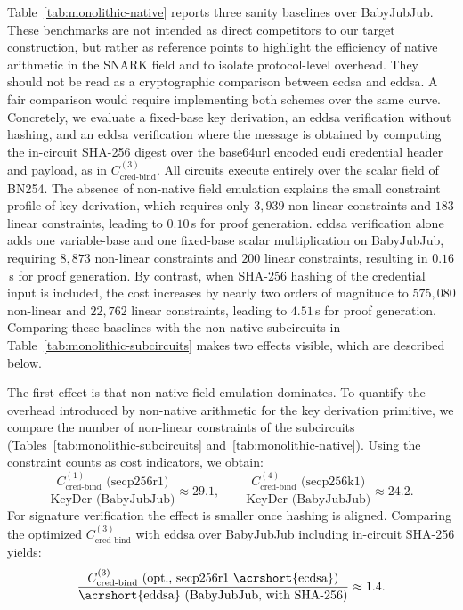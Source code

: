 Table~\ref{tab:monolithic-native} reports three sanity baselines over BabyJubJub. These benchmarks are not intended as direct competitors to our target construction, but rather as reference points to highlight the efficiency of native arithmetic in the SNARK field and to isolate protocol-level overhead. They should not be read as a cryptographic comparison between \acrshort{ecdsa} and \acrfull{eddsa}. A fair comparison would require implementing both schemes over the same curve. Concretely, we evaluate a fixed-base key derivation, an \acrshort{eddsa} verification without hashing, and an \acrshort{eddsa} verification where the message is obtained by 
computing the in-circuit SHA-256 digest over the base64url encoded \acrshort{eudi} credential header and payload, as in $C_{\text{cred-bind}}^{(3)}$. All circuits execute entirely over the scalar field of BN254. The absence of non-native field emulation explains the small constraint profile of key derivation, which requires only $3{,}939$ non-linear constraints and $183$ linear constraints, leading to $0.10$\,s for proof generation. \acrshort{eddsa} verification alone adds one variable-base and one fixed-base scalar multiplication on BabyJubJub, requiring $8{,}873$ non-linear constraints and $200$ linear constraints, resulting in $0.16$\,s for proof generation. By contrast, when SHA-256 hashing of the credential input is included, the cost increases by nearly two orders of magnitude to $575{,}080$ non-linear and $22{,}762$ linear constraints, leading to $4.51$\,s for proof generation. Comparing these baselines with the non-native subcircuits in Table~\ref{tab:monolithic-subcircuits} makes two effects visible, which are described below.

\medskip
The first effect is that non-native field emulation dominates. To quantify the overhead introduced by non-native arithmetic for the key derivation primitive, we compare the number of non-linear constraints of the subcircuits (Tables~\ref{tab:monolithic-subcircuits} and~\ref{tab:monolithic-native}). Using the constraint counts as cost indicators, we obtain:
\[
\frac{\text{$C_{\text{cred-bind}}^{(1)}$ (secp256r1)}}{\text{KeyDer (BabyJubJub)}} \approx 29.1,\qquad
\frac{\text{$C_{\text{cred-bind}}^{(4)}$ (secp256k1)}}{\text{KeyDer (BabyJubJub)}} \approx 24.2.
\]
For signature verification the effect is smaller once hashing is aligned. Comparing the optimized $C_{\text{cred-bind}}^{(3)}$ with \acrshort{eddsa} over BabyJubJub including in-circuit SHA-256 yields:
\[
\frac{\text{$C_{\text{cred-bind}}^{(3)}$ (opt., secp256r1 \acrshort{ecdsa})}}{\text{\acrshort{eddsa} (BabyJubJub, with SHA-256)}} \approx 1.4.
\]

